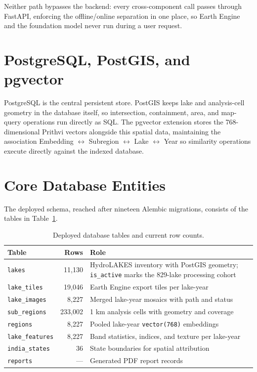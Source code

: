 \documentclass[12pt,a4paper,oneside]{report}
\newcommand{\code}[1]{\texttt{#1}}
\begin{document}
Neither path bypasses the backend: every cross-component call passes
through FastAPI, enforcing the offline/online separation in one
place, so Earth Engine and the foundation model never run during a
user request.
\label{sec:offline_online}

\section{PostgreSQL, PostGIS, and pgvector}

PostgreSQL is the central persistent store. PostGIS keeps lake and
analysis-cell geometry in the database itself, so intersection,
containment, area, and map-query operations run directly as SQL. The
pgvector extension stores the 768-dimensional Prithvi vectors
alongside this spatial data, maintaining the association Embedding
$\leftrightarrow$ Subregion $\leftrightarrow$ Lake $\leftrightarrow$
Year so similarity operations execute directly against the indexed
database.

\section{Core Database Entities}

The deployed schema, reached after nineteen Alembic migrations,
consists of the tables in Table~\ref{tab:tables}.

\begin{table}[H]
\centering
\caption{Deployed database tables and current row counts.}
\label{tab:tables}
\begin{tabularx}{\textwidth}{l r X}
\toprule
Table & Rows & Role \\
\midrule
\code{lakes} & 11{,}130 &
HydroLAKES inventory with PostGIS geometry; \code{is\_active}
marks the 829-lake processing cohort \\
\code{lake\_tiles} & 19{,}046 &
Earth Engine export tiles per lake-year \\
\code{lake\_images} & 8{,}227 &
Merged lake-year mosaics with path and status \\
\code{sub\_regions} & 233{,}002 &
1 km analysis cells with geometry and coverage \\
\code{regions} & 8{,}227 &
Pooled lake-year \code{vector(768)} embeddings \\
\code{lake\_features} & 8{,}227 &
Band statistics, indices, and texture per lake-year \\
\code{india\_states} & 36 &
State boundaries for spatial attribution \\
\code{reports} & --- &
Generated PDF report records \\
\bottomrule
\end{tabularx}
\end{table}
\end{document}
